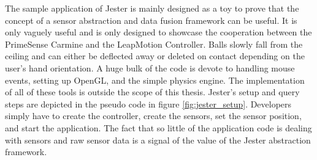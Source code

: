 The sample application of Jester is mainly designed as a toy to prove that the concept of a sensor abstraction and data fusion framework can be useful. It is only vaguely useful and is only designed to showcase the cooperation between the PrimeSense Carmine and the LeapMotion Controller. Balls slowly fall from the ceiling and can either be deflected away or deleted on contact depending on the user's hand orientation. A huge bulk of the code is devote to handling mouse events, setting up OpenGL, and the simple physics engine. The implementation of all of these tools is outside the scope of this thesis. Jester's setup and query steps are depicted in the pseudo code in figure \ref{fig:jester_setup}. Developers simply have to create the controller, create the sensors, set the sensor position, and start the application. The fact that so little of the application code is dealing with sensors and raw sensor data is a signal of the value of the Jester abstraction framework.
